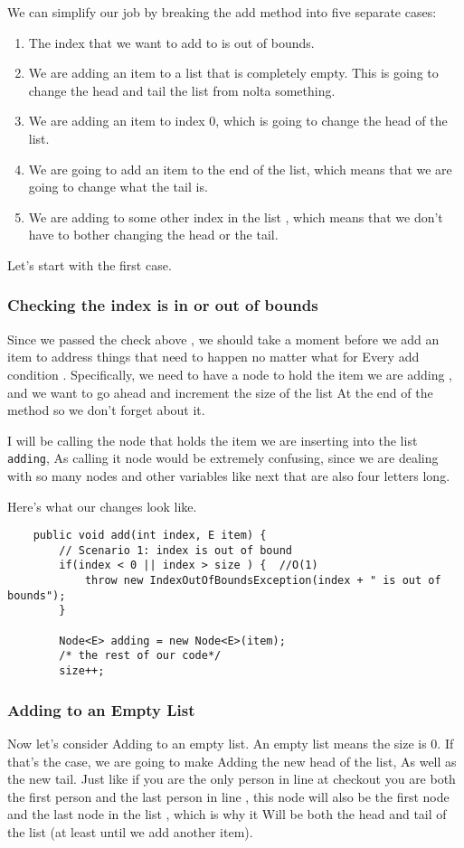 We can simplify our job by breaking the add method into five separate cases:
\begin{enumerate}
	\item The index that we want to add to is out of bounds.
	\item We are adding an item to a list that is completely empty. This is going to change the head and tail the list from nolta something. 
	\item We are adding an item to index 0, which is going to change the head of the list.
	\item We are going to add an item to the end of the list, which means that we are going to change what the tail is.
	\item We are adding to some other index in the list , which means that we don't have to bother changing the head or the tail.
\end{enumerate}


Let's start with the first case.

\subsubsection{Checking the index is in or out of bounds}

Since we passed the check above , we should take a moment before we add an item to address things that need to happen no matter what for Every add condition . Specifically, we need to have a node to hold the item we are adding , and we want to go ahead and increment the size of the list At the end of the method so we don't forget about it.

I will be calling the node that holds the item we are inserting into the list \texttt{adding}, As calling it node would be extremely confusing, since we are dealing with so many nodes and other variables like next that are also four letters long.

Here's what our changes look like.

\begin{verbatim}
	public void add(int index, E item) {
		// Scenario 1: index is out of bound
		if(index < 0 || index > size ) {  //O(1)
			throw new IndexOutOfBoundsException(index + " is out of bounds");
		}
		
		Node<E> adding = new Node<E>(item);
		/* the rest of our code*/
		size++;
	\end{verbatim}
	
	
	
	\subsubsection{Adding to an Empty List}
	Now let's consider Adding to an empty list.  An empty list means the size is 0.  If that's the case, we are going to make Adding the new head of the list, As well as the new tail.  Just like if you are the only person in line at checkout you are both the first person and the last person in line , this node will also be the first node and the last node in the list , which is why it Will be both the head and tail of the list (at least until we add another item).
	
